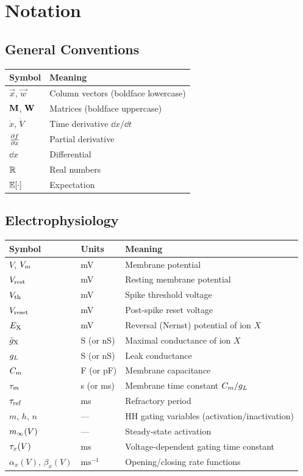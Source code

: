 \chapter*{Notation}

\section*{General Conventions}

\begin{tabular}{@{}ll@{}}
  \toprule
  \textbf{Symbol} & \textbf{Meaning} \\
  \midrule
  $\vec{x}$, $\vec{w}$ & Column vectors (boldface lowercase) \\
  $\mathbf{M}$, $\mathbf{W}$ & Matrices (boldface uppercase) \\
  $\dot{x}$, $\dot{V}$ & Time derivative $\dd x / \dd t$ \\
  $\frac{\partial f}{\partial x}$ & Partial derivative \\
  $\dd x$ & Differential \\
  $\mathbb{R}$ & Real numbers \\
  $\mathbb{E}[\cdot]$ & Expectation \\
  \bottomrule
\end{tabular}

\section*{Electrophysiology}

\begin{tabular}{@{}lll@{}}
  \toprule
  \textbf{Symbol} & \textbf{Units} & \textbf{Meaning} \\
  \midrule
  $V$, $V_m$ & mV & Membrane potential \\
  $V_{\text{rest}}$ & mV & Resting membrane potential \\
  $V_{\text{th}}$ & mV & Spike threshold voltage \\
  $V_{\text{reset}}$ & mV & Post-spike reset voltage \\
  $E_{\mathrm{X}}$ & mV & Reversal (Nernst) potential of ion $X$ \\
  $\bar{g}_{\mathrm{X}}$ & S (or nS) & Maximal conductance of ion $X$ \\
  $g_L$ & S (or nS) & Leak conductance \\
  $C_m$ & F (or pF) & Membrane capacitance \\
  $\tau_m$ & s (or ms) & Membrane time constant $C_m / g_L$ \\
  $\tau_{\text{ref}}$ & ms & Refractory period \\
  $m$, $h$, $n$ & --- & HH gating variables (activation/inactivation) \\
  $m_\infty(V)$ & --- & Steady-state activation \\
  $\tau_x(V)$ & ms & Voltage-dependent gating time constant \\
  $\alpha_x(V)$, $\beta_x(V)$ & $\text{ms}^{-1}$ & Opening/closing rate functions \\
  \bottomrule
\end{tabular}

